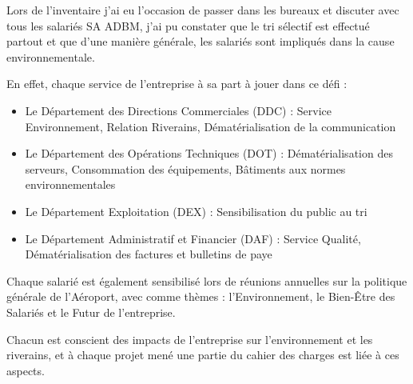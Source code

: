 Lors de l'inventaire j'ai eu l'occasion de passer dans les bureaux et discuter avec tous les salariés SA ADBM, j'ai pu constater que le tri sélectif est effectué partout et que d'une manière générale, les salariés sont impliqués dans la cause environnementale.

En effet, chaque service de l'entreprise à sa part à jouer dans ce défi :

\begin{itemize}
    \item Le Département des Directions Commerciales (DDC) : Service Environnement, Relation Riverains, Dématérialisation de la communication
    \item Le Département des Opérations Techniques (DOT) : Dématérialisation des serveurs, Consommation des équipements, Bâtiments aux normes environnementales
    \item Le Département Exploitation (DEX) : Sensibilisation du public au tri
    \item Le Département Administratif et Financier (DAF) : Service Qualité, Dématérialisation des factures et bulletins de paye
\end{itemize}

Chaque salarié est également sensibilisé lors de réunions annuelles sur la politique générale de l'Aéroport, avec comme thèmes : l'Environnement, le Bien-Être des Salariés et le Futur de l'entreprise.

Chacun est conscient des impacts de l'entreprise sur l'environnement et les riverains, et à chaque projet mené une partie du cahier des charges est liée à ces aspects.


